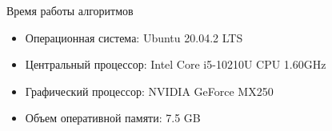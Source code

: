 \documentclass{beamer}
\begin{document}
\newcommand{\backupbegin}{\setcounter{framenumber}{16}}
\newcommand{\backupend}{\setcounter{framenumber}{16}}
\appendix
\backupbegin
\begin{frame}{Время работы алгоритмов}
\begin{itemize}
    \item Операционная система: Ubuntu 20.04.2 LTS
    \item Центральный процессор: Intel Core i5-10210U CPU 1.60GHz
    \item Графический процессор: NVIDIA GeForce MX250
    \item Объем оперативной памяти: 7.5 GB
\end{itemize}

\end{frame}
\backupend
\end{document}
